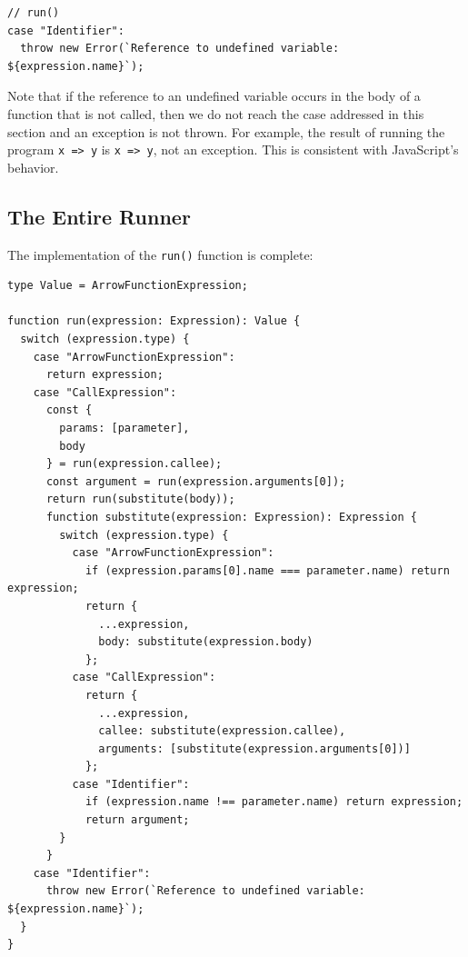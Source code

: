 \documentclass[12pt, oneside]{book}
\begin{document}
\begin{verbatim}
// run()
case "Identifier":
  throw new Error(`Reference to undefined variable: ${expression.name}`);
\end{verbatim}

Note that if the reference to an undefined variable occurs in the body of a function that is not called, then we do not reach the case addressed in this section and an exception is not thrown. For example, the result of running the program \texttt{x => y} is \texttt{x => y}, not an exception. This is consistent with JavaScript’s behavior.

\subsection{The Entire Runner}
\label{The Entire Runner}

The implementation of the \texttt{run()} function is complete:

\begin{verbatim}
type Value = ArrowFunctionExpression;

function run(expression: Expression): Value {
  switch (expression.type) {
    case "ArrowFunctionExpression":
      return expression;
    case "CallExpression":
      const {
        params: [parameter],
        body
      } = run(expression.callee);
      const argument = run(expression.arguments[0]);
      return run(substitute(body));
      function substitute(expression: Expression): Expression {
        switch (expression.type) {
          case "ArrowFunctionExpression":
            if (expression.params[0].name === parameter.name) return expression;
            return {
              ...expression,
              body: substitute(expression.body)
            };
          case "CallExpression":
            return {
              ...expression,
              callee: substitute(expression.callee),
              arguments: [substitute(expression.arguments[0])]
            };
          case "Identifier":
            if (expression.name !== parameter.name) return expression;
            return argument;
        }
      }
    case "Identifier":
      throw new Error(`Reference to undefined variable: ${expression.name}`);
  }
}
\end{verbatim}
\end{document}
